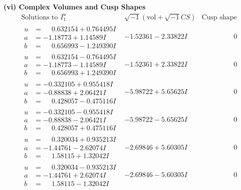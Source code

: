 \documentclass[1p]{elsarticle_modified}
\theoremstyle{definition}
\newcommand{\I}{\sqrt{-1}}
\begin{document}
\newpage\flushleft \textbf{(vi) Complex Volumes and Cusp Shapes}
$$\begin{array}{c|c|c}  
\text{Solutions to }I^u_{1}& \I (\text{vol} + \sqrt{-1}CS) & \text{Cusp shape}\\
 \hline 
\begin{aligned}
u &= \phantom{-}0.632154 + 0.764495 I \\
a &= -1.18773 + 1.14589 I \\
b &= \phantom{-}0.656993 - 1.249390 I\end{aligned}
 & -1.52361 - 2.33822 I & \phantom{-0.000000 } 0 \\ \hline\begin{aligned}
u &= \phantom{-}0.632154 - 0.764495 I \\
a &= -1.18773 - 1.14589 I \\
b &= \phantom{-}0.656993 + 1.249390 I\end{aligned}
 & -1.52361 + 2.33822 I & \phantom{-0.000000 } 0 \\ \hline\begin{aligned}
u &= -0.332105 + 0.955418 I \\
a &= -0.88838 + 2.06421 I \\
b &= \phantom{-}0.428057 - 0.475116 I\end{aligned}
 & -5.98722 + 5.65625 I & \phantom{-0.000000 } 0 \\ \hline\begin{aligned}
u &= -0.332105 - 0.955418 I \\
a &= -0.88838 - 2.06421 I \\
b &= \phantom{-}0.428057 + 0.475116 I\end{aligned}
 & -5.98722 - 5.65625 I & \phantom{-0.000000 } 0 \\ \hline\begin{aligned}
u &= \phantom{-}0.320034 + 0.935213 I \\
a &= -1.44761 - 2.62074 I \\
b &= \phantom{-}1.58115 + 1.32042 I\end{aligned}
 & -2.69846 + 5.60305 I & \phantom{-0.000000 } 0 \\ \hline\begin{aligned}
u &= \phantom{-}0.320034 - 0.935213 I \\
a &= -1.44761 + 2.62074 I \\
b &= \phantom{-}1.58115 - 1.32042 I\end{aligned}
 & -2.69846 - 5.60305 I & \phantom{-0.000000 } 0 \\ \hline\begin{aligned}

\end{aligned}
\end{array}$$
\end{document}
